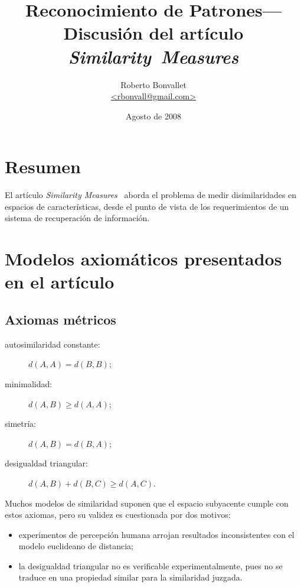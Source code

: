\documentclass[spanish]{article}
\title{Reconocimiento de Patrones---Discusión del artículo \textit{Similarity~Measures}}
\author{Roberto Bonvallet \\ \url {<rbonvall@gmail.com>}}
\date{Agosto de 2008}
\begin{document}
\maketitle

\section{Resumen}
El artículo \textit{Similarity Measures}~\cite{sim} aborda el problema de medir
disimilaridades en espacios de características, desde el punto de vista de los
requerimientos de un sistema de recuperación de información.


\section{Modelos axiomáticos presentados en el artículo}

\subsection{Axiomas métricos}
\begin{description}
    \item [autosimilaridad constante:]
        $d(A, A) = d(B, B)$;
    \item [minimalidad:]
        $d(A, B)\ge d(A, A)$;
    \item [simetría:]
        $d(A, B) = d(B, A)$;
    \item [desigualdad triangular:]
        $d(A, B) + d(B, C)\ge d(A, C)$.
\end{description}
Muchos modelos de similaridad suponen que el espacio subyacente cumple con estos axiomas,
pero su validez es cuestionada por dos motivos:
\begin{itemize}
    \item experimentos de percepción humana arrojan resultados
        inconsistentes con el modelo euclideano de distancia;
    \item la desigualdad triangular no es verificable experimentalmente,
        pues no se traduce en una propiedad similar para la similaridad juzgada.
\end{itemize}
\end{document}
